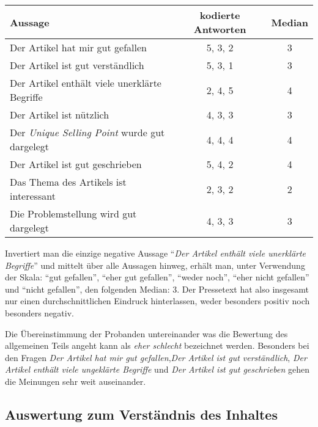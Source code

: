 \begin{table}[!ht]
    \begin{center}
        \begin{tabular}{lcc}
        \toprule
        \textbf{Aussage} & \textbf{kodierte Antworten} & \textbf{Median} \\
        \midrule
        Der Artikel hat mir gut gefallen & 5, 3, 2 & 3 \\
        Der Artikel ist gut verständlich & 5, 3, 1 & 3 \\
        Der Artikel enthält viele unerklärte Begriffe & 2, 4, 5 & 4 \\
        Der Artikel ist nützlich & 4, 3, 3 & 3 \\
        Der \emph{Unique Selling Point} wurde gut dargelegt & 4, 4, 4 & 4 \\
        Der Artikel ist gut geschrieben & 5, 4, 2 & 4 \\
        Das Thema des Artikels ist interessant & 2, 3, 2 & 2 \\
        Die Problemstellung wird gut dargelegt & 4, 3, 3 & 3 \\
        \bottomrule
        \end{tabular}
    \end{center}
\end{table}

Invertiert man die einzige negative Aussage \enquote{\emph{Der Artikel enthält
viele unerklärte Begriffe}} und mittelt über alle Aussagen hinweg, erhält man,
unter Verwendung der Skala: \enquote{gut gefallen}, \enquote{eher gut
gefallen}, \enquote{weder noch}, \enquote{eher nicht gefallen} und
\enquote{nicht gefallen}, den folgenden Median: 3.
Der Pressetext hat also insgesamt nur einen durchschnittlichen Eindruck hinterlassen, 
weder besonders positiv noch besonders negativ.

Die Übereinstimmung der Probanden untereinander was die Bewertung des
allgemeinen Teils angeht kann als \emph{eher schlecht} bezeichnet werden.
Besonders bei den Fragen {\emph{Der Artikel hat mir gut gefallen}},{\emph{Der Artikel ist gut verständlich}},
 {\emph{Der Artikel enthält viele ungeklärte Begriffe}} und {\emph{Der Artikel ist gut geschrieben}} 
gehen die Meinungen sehr weit auseinander.


\subsection{Auswertung zum Verständnis des Inhaltes}

